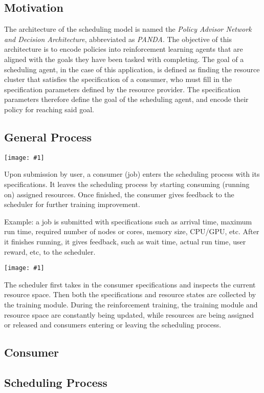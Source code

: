 \documentclass{article}
\theoremstyle{definition}
\theoremstyle{remark}
\newcommand{\addpic}[1]{\texttt{[image: \#1]}}
\begin{document}
	\subsection{Motivation}
	The architecture of the scheduling model is named the \emph{Policy Advisor Network and Decision Architecture}, abbreviated as \emph{PANDA}. The objective of this architecture is to encode policies into reinforcement learning agents that are aligned with the goals they have been tasked with completing. The goal of a scheduling agent, in the case of this application, is defined as finding the resource cluster that satisfies the specification of a consumer, who must fill in the specification parameters defined by the resource provider. The specification parameters therefore define the goal of the scheduling agent, and encode their policy for reaching said goal. 
	

	\subsection{General Process}
	
	\addpic{Intro1.jpg}	
	
	Upon submission by user, a consumer (job) enters the scheduling process with its specifications. It leaves the scheduling process by starting consuming (running on) assigned resources. Once finished, the consumer gives feedback to the scheduler for further training improvement.
	
	Example: a job is submitted with specifications such as arrival time, maximum run time, required number of nodes or cores, memory size, CPU/GPU, etc. After it finishes running, it gives feedback, such as wait time, actual run time, user reward, etc, to the scheduler.
	
	\addpic{Intro2.jpg}
	
	The scheduler first takes in the consumer specifications and inspects the current resource space. Then both the specifications and resource states are collected by the training module. During the reinforcement training, the training module and resource space are constantly being updated, while resources are being assigned or released and consumers entering or leaving the scheduling process.
	

	\subsection{Consumer}
	
	
	\subsection{Scheduling Process}
	
\end{document}
